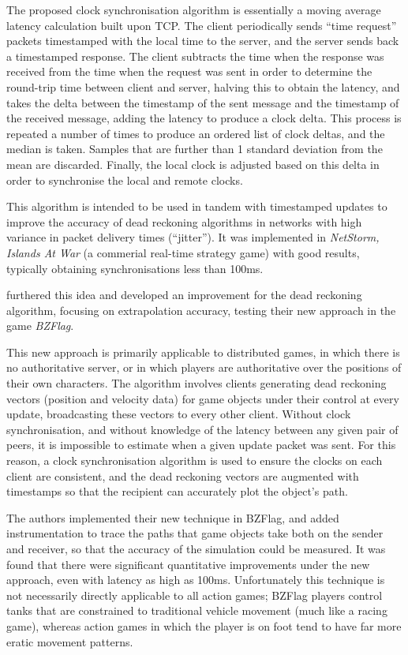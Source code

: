 \documentclass[conference]{IEEEtran}
\begin{document}
	The proposed clock synchronisation algorithm is essentially a moving average latency calculation built upon TCP. The client periodically sends ``time request'' packets timestamped with the local time to the server, and the server sends back a timestamped response. The client subtracts the time when the response was received from the time when the request was sent in order to determine the round-trip time between client and server, halving this to obtain the latency, and takes the delta between the timestamp of the sent message and the timestamp of the received message, adding the latency to produce a clock delta. This process is repeated a number of times to produce an ordered list of clock deltas, and the median is taken. Samples that are further than 1 standard deviation from the mean are discarded. Finally, the local clock is adjusted based on this delta in order to synchronise the local and remote clocks.

	This algorithm is intended to be used in tandem with timestamped updates to improve the accuracy of dead reckoning algorithms in networks with high variance in packet delivery times (``jitter''). It was implemented in \emph{NetStorm, Islands At War} (a commerial real-time strategy game) with good results, typically obtaining synchronisations less than 100ms.

	\Textcite{aggarwal2004accuracy} furthered this idea and developed an improvement for the dead reckoning algorithm, focusing on extrapolation accuracy, testing their new approach in the game \emph{BZFlag}.

	This new approach is primarily applicable to distributed games, in which there is no authoritative server, or in which players are authoritative over the positions of their own characters. The algorithm involves clients generating dead reckoning vectors (position and velocity data) for game objects under their control at every update, broadcasting these vectors to every other client. Without clock synchronisation, and without knowledge of the latency between any given pair of peers, it is impossible to estimate when a given update packet was sent. For this reason, a clock synchronisation algorithm is used to ensure the clocks on each client are consistent, and the dead reckoning vectors are augmented with timestamps so that the recipient can accurately plot the object's path.

	The authors implemented their new technique in BZFlag, and added instrumentation to trace the paths that game objects take both on the sender and receiver, so that the accuracy of the simulation could be measured. It was found that there were significant quantitative improvements under the new approach, even with latency as high as 100ms. Unfortunately this technique is not necessarily directly applicable to all action games; BZFlag players control tanks that are constrained to traditional vehicle movement (much like a racing game), whereas action games in which the player is on foot tend to have far more eratic movement patterns.
\end{document}
